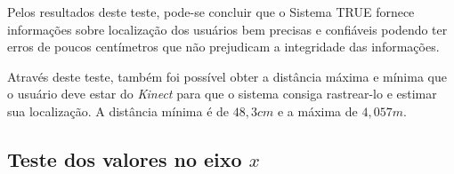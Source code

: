 	Pelos resultados deste teste, pode-se concluir que o Sistema TRUE fornece informações sobre localização dos usuários bem precisas e confiáveis podendo ter erros de poucos centímetros que não prejudicam a integridade das informações. 

	Através deste teste, também foi possível obter a distância máxima e mínima que o usuário deve estar do \textit{Kinect} para que o sistema consiga rastrear-lo e estimar sua localização. A distância mínima é de $\displaystyle 48,3 cm$ e a máxima de $\displaystyle 4,057 m$.

\subsection{Teste dos valores no eixo $\displaystyle x$}

















